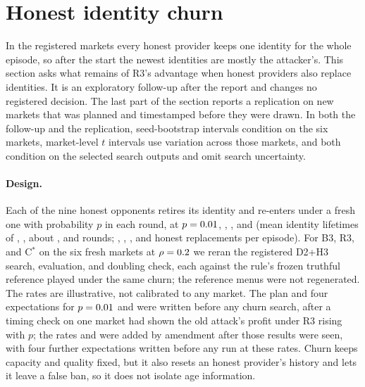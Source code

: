 \documentclass[11pt]{article}
\begin{document}

\section{Honest identity churn}\label{sec:churn}
In the registered markets every honest provider keeps one identity for the whole episode, so after the start the newest identities are mostly the attacker's. This section asks what remains of R3's advantage when honest providers also replace identities. It is an exploratory follow-up after the report and changes no registered decision. The last part of the section reports a replication on new markets that was planned and timestamped before they were drawn. In both the follow-up and the replication, seed-bootstrap intervals condition on the six markets, market-level $t$ intervals use variation across those markets, and both condition on the selected search outputs and omit search uncertainty.

\paragraph{Design.} Each of the nine honest opponents retires its identity and re-enters under a fresh one with probability $p$ in each round, at $p = 0.01$, , , and  (mean identity lifetimes of , , about , and  rounds; , , , and  honest replacements per episode). For B3, R3, and C$^*$ on the six fresh markets at $\rho=0.2$ we reran the registered D2+H3 search, evaluation, and doubling check, each against the rule's frozen truthful reference played under the same churn; the reference menus were not regenerated. The rates are illustrative, not calibrated to any market. The plan and four expectations for $p = 0.01$ and  were written before any churn search, after a timing check on one market had shown the old attack's profit under R3 rising with $p$; the rates  and  were added by amendment after those results were seen, with four further expectations written before any run at these rates. Churn keeps capacity and quality fixed, but it also resets an honest provider's history and lets it leave a false ban, so it does not isolate age information.
\end{document}
